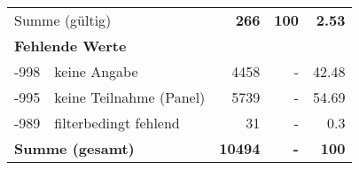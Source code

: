 \begin{longtable}{lXrrr}
     \midrule
     \multicolumn{2}{l}{Summe (gültig)} &
       \textbf{\num{266}} &
     \textbf{100} &
       \textbf{\num[round-mode=places,round-precision=2]{2,53}} \\
     \multicolumn{5}{l}{\textbf{Fehlende Werte}}\\
       -998 &
       keine Angabe &
         \num{4458} &
        - &
         \num[round-mode=places,round-precision=2]{42,48} \\
       -995 &
       keine Teilnahme (Panel) &
         \num{5739} &
        - &
         \num[round-mode=places,round-precision=2]{54,69} \\
       -989 &
       filterbedingt fehlend &
         \num{31} &
        - &
         \num[round-mode=places,round-precision=2]{0,3} \\
     \midrule
     \multicolumn{2}{l}{\textbf{Summe (gesamt)}} &
          \textbf{\num{10494}} &
        \textbf{-} &
        \textbf{100} \\
     \bottomrule
     \end{longtable}
     
